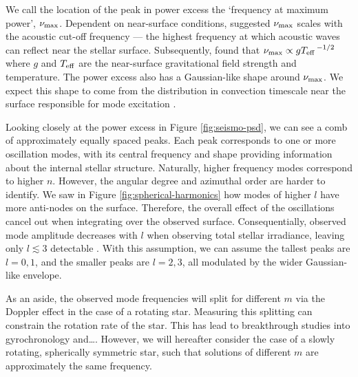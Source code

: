 We call the location of the peak in power excess the `frequency at maximum power', \({\nu_\mathrm{max}}\). Dependent on near-surface conditions, \citet{Brown.Gilliland.ea1991} suggested \({\nu_\mathrm{max}}\) scales with the acoustic cut-off frequency --- the highest frequency at which acoustic waves can reflect near the stellar surface. Subsequently, \citet{Kjeldsen.Bedding1995} found that \({\nu_\mathrm{max}} \propto g{T_\mathrm{eff}}^{\,-1/2}\) where \(g\) and \({T_\mathrm{eff}}\) are the near-surface gravitational field strength and temperature. The power excess also has a Gaussian-like shape around \({\nu_\mathrm{max}}\). We expect this shape to come from the distribution in convection timescale near the surface responsible for mode excitation \needcite.

Looking closely at the power excess in Figure \ref{fig:seismo-psd}, we can see a comb of approximately equally spaced peaks. Each peak corresponds to one or more oscillation modes, with its central frequency and shape providing information about the internal stellar structure. Naturally, higher frequency modes correspond to higher \(n\). However, the angular degree and azimuthal order are harder to identify. We saw in Figure \ref{fig:spherical-harmonics} how modes of higher \(l\) have more anti-nodes on the surface. Therefore, the overall effect of the oscillations cancel out when integrating over the observed surface. Consequentially, observed mode amplitude decreases with \(l\) when observing total stellar irradiance, leaving only \(l \lesssim 3\) detectable \needcite. With this assumption, we can assume the tallest peaks are \(l=0,1\), and the smaller peaks are \(l=2,3\), all modulated by the wider Gaussian-like envelope.

As an aside, the observed mode frequencies will split for different \(m\) via the Doppler effect in the case of a rotating star. Measuring this splitting can constrain the rotation rate of the star. This has lead to breakthrough studies into gyrochronology and\dots \citep[e.g.][]{Hall.Davies.ea2021}. However, we will hereafter consider the case of a slowly rotating, spherically symmetric star, such that solutions of different \(m\) are approximately the same frequency.

